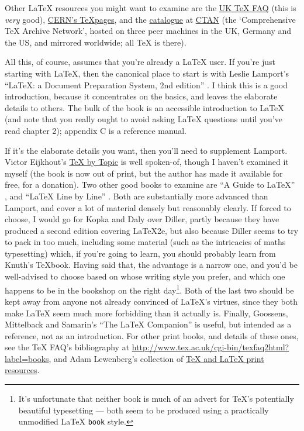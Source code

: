 \documentclass[11pt,oneside,chapters]{starlink}
\begin{document}
Other LaTeX resources you might want to examine are the
\href{http://www.tex.ac.uk/faq}{UK TeX FAQ} (this is \emph{very} good),
\href{http://wwwinfo.cern.ch/asdoc/textproc.html}{CERN's TeXpages},
and the \href{http://www.tex.ac.uk/tex-archive/help/Catalogue/catalogue.html}{catalogue}
at \href{http://www.tex.ac.uk}{CTAN}
(the `Comprehensive TeX Archive Network', hosted on three peer
machines in the UK, Germany and the US, and mirrored
worldwide; all TeX is there).

All this, of course, assumes that you're already a LaTeX user.
If you're just starting with LaTeX, then the canonical place to
start is with Leslie Lamport's
``LaTeX: a Document Preparation System, 2nd edition'' \citep{lamport}.
I think this is a good
introduction, because it concentrates on the basics, and leaves the
elaborate details to others.  The bulk of the book is an accessible
introduction to LaTeX (and note that you really ought to avoid asking
LaTeX questions until you've read chapter 2); appendix C is
a reference manual.

If it's the elaborate details you
want, then you'll need to supplement Lamport.  Victor Eijkhout's
\href{http://www.eijkhout.net/tbt/}{TeX by Topic} is
well spoken-of, though I haven't examined it myself (the book is now out
of print, but the author has made it available for free, for a donation).
Two other good books to
examine are
``A Guide to LaTeX'' \citep{kopka},
and ``LaTeX Line by Line'' \citep{diller}.
Both are substantially more advanced than Lamport,
and cover a lot of material densely but reasonably clearly.  If forced
to choose, I would go for Kopka and Daly over Diller, partly because
they have produced a second edition covering LaTeX2e, but also
because Diller seems to try to pack in too much, including some
material (such as the intricacies of maths typesetting) which, if
you're going to learn, you should probably learn from Knuth's TeXbook.
Having said that, the advantage is a narrow one, and you'd be
well-advised to choose based on whose writing style you prefer, and
which one happens to be in the bookshop on the right day\footnote{It's
unfortunate that neither book is much of an advert for TeX's
potentially beautiful typesetting --- both seem to be produced using a
practically unmodified LaTeX \texttt{book} style.}.
Both of the last two should be kept away from anyone not already convinced of
LaTeX's virtues, since they both make LaTeX seem much
more forbidding than it actually is.
Finally, Goossens,
Mittelback and Samarin's
``The LaTeX Companion'' \citep{goossens}
is useful, but intended as a reference, not as an
introduction.  For other print books, and details of these ones, see the
TeX FAQ's bibliography at
\url{http://www.tex.ac.uk/cgi-bin/texfaq2html?label=books}, and Adam
Lewenberg's collection of
\href{http://www.macrotex.net/texbooks/}{TeX and LaTeX print resources}.
\end{document}
